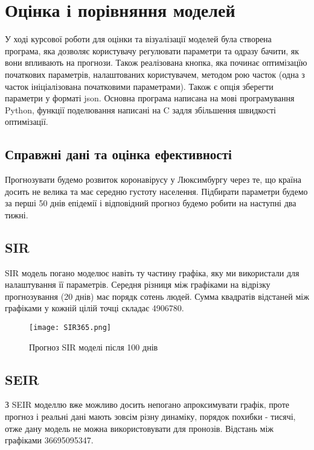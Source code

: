 \chapter{Оцінка і порівняння моделей}


У ході курсової роботи для оцінки та візуалізації моделей була створена 
програма, яка дозволяє користувачу регулювати параметри та одразу бачити, 
як вони впливають на прогнози. Також реалізована кнопка, яка починає 
оптимізацїю початкових параметрів, налаштованих користувачем, методом рою 
часток (одна з часток ініціалізована початковими параметрами). Також 
є опція зберегти параметри у форматі json. 
Основна програма написана на мові програмування Python, функції поделювання 
написані на C задля збільшення швидкості оптимізації.


\section{Справжні дані та оцінка ефективності}

Прогнозувати будемо розвиток коронавірусу у Люксимбургу через те, що країна 
досить не велика та має середню густоту населення. 
Підбирати параметри будемо за перші 50 днів епідемії і відповідний прогноз 
будемо робити на наступні два тижні. 

\section{SIR}


SIR модель погано моделює навіть ту частину графіка, яку ми використали для 
налаштування її параметрів. Середня різниця між графіками на відрізку 
прогнозування (20 днів) має порядк сотень людей. 
Сумма квадратів відстаней між графіками у кожній цілій точці 
складає 4906780.


\begin{figure}[H]
    \centering
    \texttt{[image: SIR365.png]}
    \caption{Прогноз SIR моделі після 100 днів}
    \label{fig:plot1}
\end{figure}


\section{SEIR}


З SEIR моделлю вже можливо досить непогано апроксимувати графік, проте 
прогноз і реальні дані мають зовсім різну динаміку, порядок похибки - 
тисячі, отже дану модель не можна використовувати для пронозів. 
Відстань між графіками 36695095347.


